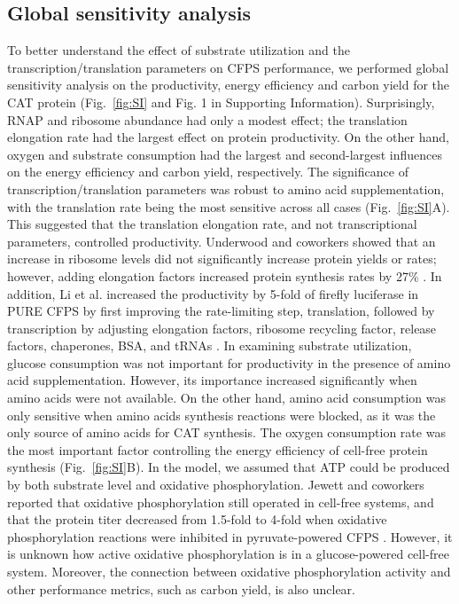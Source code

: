 \documentclass[journal=asbcd6,manuscript=article]{achemso}
\begin{document}

\subsection{Global sensitivity analysis}
To better understand the effect of substrate utilization and the transcription/translation parameters on CFPS performance, we performed global sensitivity analysis on the productivity, energy efficiency and carbon yield for the CAT protein (Fig.~\ref{fig:SI} and Fig. 1 in Supporting Information).
Surprisingly, RNAP and ribosome abundance had only a modest effect; the translation elongation rate had the largest effect on protein productivity.
On the other hand, oxygen and substrate consumption had the largest and second-largest influences on the energy efficiency and carbon yield, respectively.
The significance of transcription/translation parameters was robust to amino acid supplementation, with the translation rate being the most sensitive across all cases (Fig.~\ref{fig:SI}A).
This suggested that the translation elongation rate, and not transcriptional parameters, controlled productivity.
Underwood and coworkers showed that an increase in ribosome levels did not significantly increase protein yields or rates; however, adding elongation factors increased protein synthesis rates by 27\% \cite{2005_underwood_biotech}.
In addition, Li et al. increased the productivity by 5-fold of firefly luciferase in PURE CFPS by first improving the rate-limiting step, translation, followed by transcription by adjusting elongation factors, ribosome recycling factor, release factors, chaperones, BSA, and tRNAs \cite{2014_li_PlosOne}.
In examining substrate utilization, glucose consumption was not important for productivity in the presence of amino acid supplementation.
However, its importance increased significantly when amino acids were not available.
On the other hand, amino acid consumption was only sensitive when amino acids synthesis reactions were blocked, as it was the only source of amino acids for CAT synthesis.
The oxygen consumption rate was the most important factor controlling the energy efficiency of cell-free protein synthesis (Fig.~\ref{fig:SI}B).
In the model, we assumed that ATP could be produced by both substrate level and oxidative phosphorylation.
Jewett and coworkers reported that oxidative phosphorylation still operated in cell-free systems, and that the protein titer decreased from 1.5-fold to 4-fold when oxidative phosphorylation reactions were inhibited in pyruvate-powered CFPS \cite{Jewett:2008aa}.
However, it is unknown how active oxidative phosphorylation is in a glucose-powered cell-free system.
Moreover, the connection between oxidative phosphorylation activity and other performance metrics, such as carbon yield, is also unclear.
\end{document}
